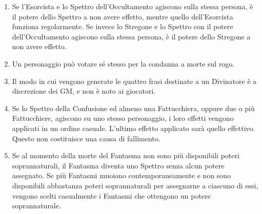 \documentclass[a4paper,10pt]{article}
\begin{document}
\begin{enumerate}
	\item Se l'Esorcista e lo Spettro dell'Occultamento agiscono sulla stessa persona, è il potere dello Spettro a non avere effetto, mentre quello dell'Esorcista funziona regolarmente. Se invece lo Stregone e lo Spettro con il potere dell'Occultamento agiscono sulla stessa persona, è il potere dello Stregone a non avere effetto.
	
	\item Un personaggio può votare sé stesso per la condanna a morte sul rogo.
	
	
	
	\item Il modo in cui vengono generate le quattro frasi destinate a un Divinatore è a discrezione dei GM, e non è noto ai giocatori.
	

	\item Se lo Spettro della Confusione ed almeno una Fattucchiera, oppure due o più Fattucchiere, agiscono su uno stesso personaggio, i loro effetti vengono applicati in un ordine casuale. L'ultimo effetto applicato sarà quello effettivo. Questo non costituisce una causa di fallimento.
	
	\item Se al momento della morte del Fantasma non sono più disponibili poteri soprannaturali, il Fantasma diventa uno Spettro senza alcun potere assegnato. Se più Fantasmi muoiono contemporaneamente e non sono disponibili abbastanza poteri soprannaturali per assegnarne a ciascuno di essi, vengono scelti casualmente i Fantasmi che ottengono un potere soprannaturale.
	

\end{enumerate}
\end{document}
